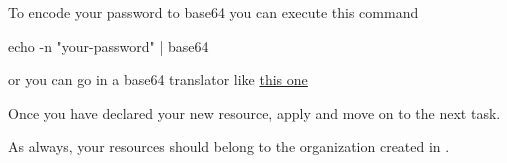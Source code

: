 \begin{tip}
    To encode your password to base64 you can execute this command 
    \begin{shell}
    echo -n "your-password" | base64
    \end{shell}
    or you can go in a base64 translator like \href{https://www.base64encode.org/}{this one}
\end{tip}


Once you have declared your new resource, apply and move on to the next task.

\begin{warn}
As always, your resources should belong to the organization created in
.
\end{warn}

